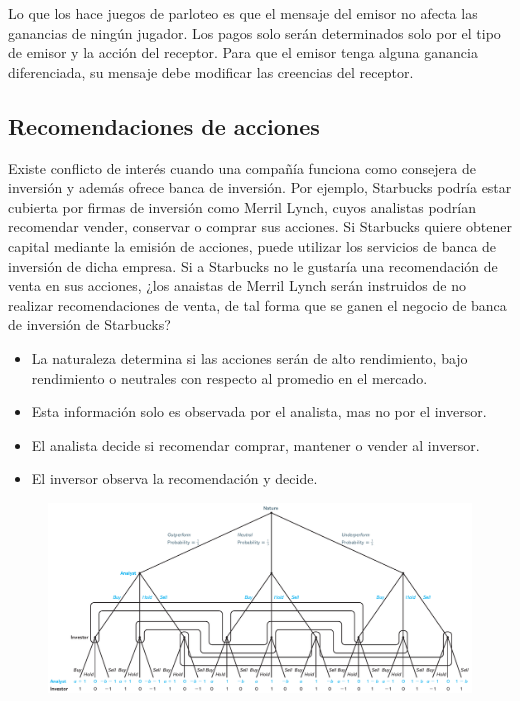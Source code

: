 \documentclass[12pt]{article}
\begin{document}
Lo que los hace juegos de parloteo es que el mensaje del emisor no afecta las ganancias de ningún jugador. Los pagos solo serán determinados solo por el tipo de emisor y la acción del receptor. Para que el emisor tenga alguna ganancia diferenciada, su mensaje debe modificar las creencias del receptor.

\subsection{Recomendaciones de acciones}

Existe conflicto de interés cuando una compañía funciona como consejera de inversión y además ofrece banca de inversión. Por ejemplo, Starbucks podría estar cubierta por firmas de inversión como Merril Lynch, cuyos analistas podrían recomendar vender, conservar o comprar sus acciones. Si Starbucks quiere obtener capital mediante la emisión de acciones, puede utilizar los servicios de banca de inversión de dicha empresa. Si a Starbucks no le gustaría una recomendación de venta en sus acciones, ¿los anaistas de Merril Lynch serán instruidos de no realizar recomendaciones de venta, de tal forma que se ganen el negocio de banca de inversión de Starbucks?

\begin{itemize}
	\setlength{\itemsep}{0pt}
	\setlength{\parskip}{0pt}
	\setlength{\parsep}{0pt}
	\item La naturaleza determina si las acciones serán de alto rendimiento, bajo rendimiento o neutrales con respecto al promedio en el mercado.
	\item Esta información solo es observada por el analista, mas no por el inversor.
	\item El analista decide si recomendar comprar, mantener o vender al inversor.
	\item El inversor observa la recomendación y decide.
\end{itemize}

\begin{figure}[H]
	\centering
	\includegraphics[width=\textwidth]{stock_cheap}
	\label{fig:figX}
\end{figure}
\end{document}
